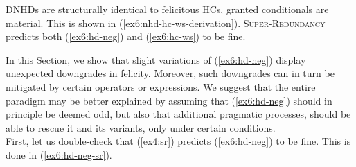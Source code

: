 DNHDs are structurally identical to felicitous HCs, granted conditionals are material. This is shown in (\ref{ex6:nhd-hc-ws-derivation}). \textsc{Super-Redundancy} predicts both (\ref{ex6:hd-neg}) and (\ref{ex6:hc-ws}) to be fine.

\begin{exe}
	\label{ex6:nhd-hc-ws-derivation}
\end{exe}

In this Section, we show that slight variations of (\ref{ex6:hd-neg}) display unexpected downgrades in felicity. Moreover, such downgrades can in turn be mitigated by certain operators or expressions. We suggest that the entire paradigm may be better explained by assuming that (\ref{ex6:hd-neg}) should in principle be deemed odd, but also that additional pragmatic processes, should be able to rescue it and its variants, only under certain conditions.\\

First, let us double-check that (\ref{ex4:sr}) predicts (\ref{ex6:hd-neg}) to be fine. This is done in (\ref{ex6:hd-neg-sr}).

